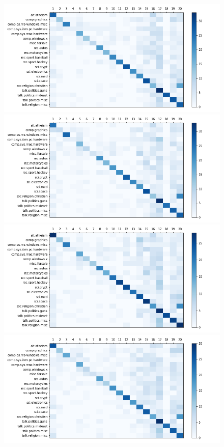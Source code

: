 \documentclass[12pt]{article}
\begin{document}
\begin{enumerate}[label=(\alph*)]
\begin{figure}[!ht]
      \includegraphics[scale=0.2]{figures/local_sensitivity_hashing_l=128_d=13.png}
      \includegraphics[scale=0.2]{figures/local_sensitivity_hashing_l=128_d=14.png}
      \includegraphics[scale=0.2]{figures/local_sensitivity_hashing_l=128_d=15.png}
      \includegraphics[scale=0.2]{figures/local_sensitivity_hashing_l=128_d=16.png}

\end{figure}
\end{enumerate}
\end{document}
